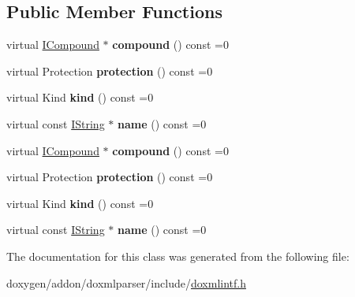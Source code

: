 \subsection*{Public Member Functions}
\begin{DoxyCompactItemize}
\item 
\mbox{\label{class_i_related_compound_a81bf8516e2502f8a21d5004c19f3e73d}} 
virtual \mbox{\hyperlink{class_i_compound}{I\+Compound}} $\ast$ {\bfseries compound} () const =0
\item 
\mbox{\label{class_i_related_compound_ab68e4040e3d77d60cce7dd97b788c867}} 
virtual Protection {\bfseries protection} () const =0
\item 
\mbox{\label{class_i_related_compound_aac173393a82a87f8139459c1c0e9c138}} 
virtual Kind {\bfseries kind} () const =0
\item 
\mbox{\label{class_i_related_compound_a9d3880ea4da5a8f55ecf30eac948470c}} 
virtual const \mbox{\hyperlink{class_i_string}{I\+String}} $\ast$ {\bfseries name} () const =0
\item 
\mbox{\label{class_i_related_compound_a81bf8516e2502f8a21d5004c19f3e73d}} 
virtual \mbox{\hyperlink{class_i_compound}{I\+Compound}} $\ast$ {\bfseries compound} () const =0
\item 
\mbox{\label{class_i_related_compound_ab68e4040e3d77d60cce7dd97b788c867}} 
virtual Protection {\bfseries protection} () const =0
\item 
\mbox{\label{class_i_related_compound_aac173393a82a87f8139459c1c0e9c138}} 
virtual Kind {\bfseries kind} () const =0
\item 
\mbox{\label{class_i_related_compound_a9d3880ea4da5a8f55ecf30eac948470c}} 
virtual const \mbox{\hyperlink{class_i_string}{I\+String}} $\ast$ {\bfseries name} () const =0
\end{DoxyCompactItemize}


The documentation for this class was generated from the following file\+:\begin{DoxyCompactItemize}
\item 
doxygen/addon/doxmlparser/include/\mbox{\hyperlink{include_2doxmlintf_8h}{doxmlintf.\+h}}\end{DoxyCompactItemize}
